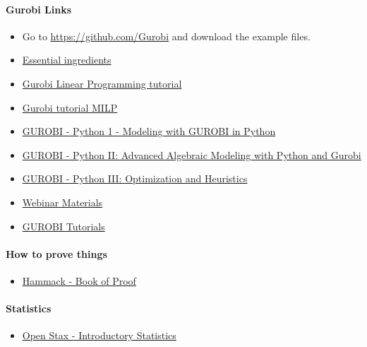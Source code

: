 \paragraph{\textbf{Gurobi Links}}
\begin{itemize}
\item Go to \url{https://github.com/Gurobi} and download the example files.
\item \href{https://pages.gurobi.com/rs/181-ZYS-005/images/Management%20Paper_5%20Essential%20Ingredients%20for%20Optimization%20Success.pdf}{Essential ingredients}
\item \href{https://www.gurobi.com/resource/mathematical-programming-tutorial-linear-programming/}{Gurobi Linear Programming tutorial}
\item \href{https://www.gurobi.com/resource/tutorial-mixed-integer-linear-programming/}{Gurobi tutorial MILP}
\item \href{https://www.gurobi.com/resource/python-i-webinar/}{GUROBI - Python 1 - Modeling with GUROBI in Python}
\item \href{https://www.gurobi.com/resource/python-ii-webinar/}{GUROBI - Python II: Advanced Algebraic Modeling with Python and Gurobi}
\item \href{https://www.gurobi.com/resource/python-iii-webinar/}{GUROBI - Python III: Optimization and Heuristics}
\item \href{https://www.gurobi.com/wp-content/uploads/2018/12/python-3-webinar-materials.zip}{Webinar Materials}
\item \href{https://www.gurobi.com/resources/?category-filter=tutorials}{GUROBI Tutorials}
\end{itemize}

\paragraph{\textbf{How to prove things}}
\begin{itemize}
\item \href{https://open.umn.edu/opentextbooks/textbooks/book-of-proof}{Hammack - Book of Proof}
\end{itemize}

\paragraph{\textbf{Statistics}}
\begin{itemize}
\item\href{https://d3bxy9euw4e147.cloudfront.net/oscms-prodcms/media/documents/IntroductoryStatistics-OP_LXn0jei.pdf}{Open Stax - Introductory Statistics}
\end{itemize}

